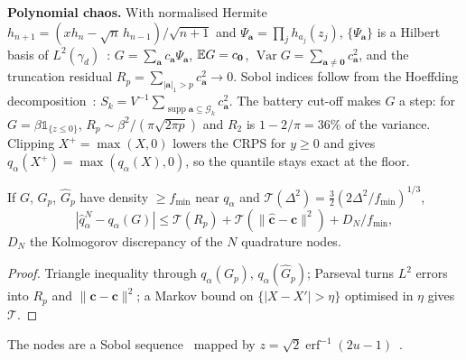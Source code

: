 \documentclass[10pt,twocolumn]{article}
\newcommand{\Var}{\operatorname{Var}}
\newcommand{\erf}{\operatorname{erf}}
\newcommand{\ind}[1]{\mathds 1_{\{#1\}}}
\begin{document}
\textbf{Polynomial chaos.} With normalised Hermite $h_{n+1}=(xh_n-\sqrt n\,h_{n-1})/\sqrt{n+1}$ and $\Psi_{\bm a}=\prod_jh_{a_j}(z_j)$, $\{\Psi_{\bm a}\}$ is a Hilbert basis of $L^2(\gamma_d)$~\cite{cameron1947,ghanem1991,xiu2002}: $G=\sum_{\bm a}c_{\bm a}\Psi_{\bm a}$, $\mathbb{E} G=c_{\bm0}$, $\Var G=\sum_{\bm a\neq\bm0}c_{\bm a}^2$, and the truncation residual $R_p=\sum_{|\bm a|_1>p}c_{\bm a}^2\to0$. Sobol indices follow from the Hoeffding decomposition~\cite{hoeffding1948,sudret2008}: $S_k=V^{-1}\sum_{\operatorname{supp}\bm a\subseteq\mathcal G_k}c_{\bm a}^2$. The battery cut-off makes $G$ a step: for $G=\beta\ind{z\le0}$, $R_p\sim\beta^2/(\pi\sqrt{2\pi p})$ and $R_2$ is $1-2/\pi=36\%$ of the variance. Clipping $X^+=\max(X,0)$ lowers the CRPS for $y\ge0$ and gives $q_\alpha(X^+)=\max(q_\alpha(X),0)$, so the quantile stays exact at the floor.
\begin{theorem}
If $G$, $G_p$, $\hat G_p$ have density $\ge f_{\min}$ near $q_\alpha$ and $\mathcal T(\Delta^2)=\tfrac32(2\Delta^2/f_{\min})^{1/3}$,
\[|\hat q^N_\alpha-q_\alpha(G)|\le\mathcal T(R_p)+\mathcal T(\|\hat{\bm c}-\bm c\|^2)+D_N/f_{\min},\]
$D_N$ the Kolmogorov discrepancy of the $N$ quadrature nodes.
\end{theorem}
\begin{proof}
Triangle inequality through $q_\alpha(G_p)$, $q_\alpha(\hat G_p)$; Parseval turns $L^2$ errors into $R_p$ and $\|\hat{\bm c}-\bm c\|^2$; a Markov bound on $\{|X-X'|>\eta\}$ optimised in $\eta$ gives $\mathcal T$.
\end{proof}
The nodes are a Sobol sequence~\cite{sobol1967} mapped by $z=\sqrt2\erf^{-1}(2u-1)$~\cite{niederreiter1992}.
\end{document}
